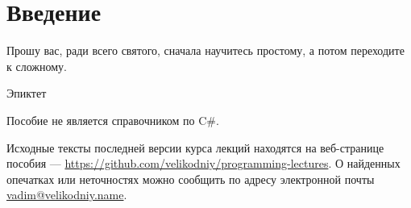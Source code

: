 \chapter*{Введение}

\epigraph{Прошу вас, ради всего святого, сначала научитесь простому, а
потом переходите к сложному.}{Эпиктет}

\lipsum[1-7]

Пособие не является справочником по C\#.

Исходные тексты последней версии курса лекций находятся на
веб-странице пособия —
\url{https://github.com/velikodniy/programming-lectures}. О найденных
опечатках или неточностях можно сообщить по адресу электронной почты
\href{mailto:vadim@veikodniy.name}{vadim@velikodniy.name}.
